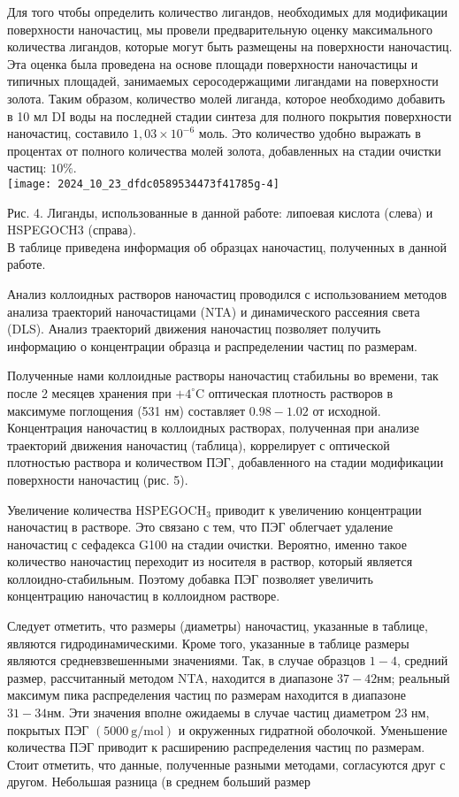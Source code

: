 \documentclass[10pt, a4paper]{article}
\begin{document}
Для того чтобы определить количество лигандов, необходимых для модификации поверхности наночастиц, мы провели предварительную оценку максимального количества лигандов, которые могут быть размещены на поверхности наночастиц. Эта оценка была проведена на основе площади поверхности наночастицы и типичных площадей, занимаемых серосодержащими лигандами на поверхности золота. Таким образом, количество молей лиганда, которое необходимо добавить в 10 мл DI воды на последней стадии синтеза для полного покрытия поверхности наночастиц, составило \(1,03 \times 10^{-6}\) моль. Это количество удобно выражать в процентах от полного количества молей золота, добавленных на стадии очистки частиц: \(10 \%\).\\
\texttt{[image: 2024\_10\_23\_dfdc0589534473f41785g-4]}

Рис. 4. Лиганды, использованные в данной работе: липоевая кислота (слева) и HSPEGOCH3 (справа).\\
В таблице приведена информация об образцах наночастиц, полученных в данной работе.

Анализ коллоидных растворов наночастиц проводился с использованием методов анализа траекторий наночастицами (NTA) и динамического рассеяния света (DLS). Анализ траекторий движения наночастиц позволяет получить информацию о концентрации образца и распределении частиц по размерам.

Полученные нами коллоидные растворы наночастиц стабильны во времени, так после 2 месяцев хранения при \(+4^{\circ} \mathrm{C}\) оптическая плотность растворов в максимуме поглощения (531 нм) составляет \(0.98-1.02\) от исходной. Концентрация наночастиц в коллоидных растворах, полученная при анализе траекторий движения наночастиц (таблица), коррелирует с оптической плотностью раствора и количеством ПЭГ, добавленного на стадии модификации поверхности наночастиц (рис. 5).

Увеличение количества \(\mathrm{HSPEGOCH}_{3}\) приводит к увеличению концентрации наночастиц в растворе. Это связано с тем, что ПЭГ облегчает удаление наночастиц с сефадекса G100 на стадии очистки. Вероятно, именно такое количество наночастиц переходит из носителя в раствор, который является коллоидно-стабильным. Поэтому добавка ПЭГ позволяет увеличить концентрацию наночастиц в коллоидном растворе.

Следует отметить, что размеры (диаметры) наночастиц, указанные в таблице, являются гидродинамическими. Кроме того, указанные в таблице размеры являются средневзвешенными значениями. Так, в случае образцов \(1-4\), средний размер, рассчитанный методом NTA, находится в диапазоне \(37-42 \text{нм}\); реальный максимум пика распределения частиц по размерам находится в диапазоне \(31-34 \text{нм}\). Эти значения вполне ожидаемы в случае частиц диаметром 23 нм, покрытых ПЭГ \((5000 \mathrm{~g} / \mathrm{mol})\) и окруженных гидратной оболочкой. Уменьшение количества ПЭГ приводит к расширению распределения частиц по размерам. Стоит отметить, что данные, полученные разными методами, согласуются друг с другом. 
Небольшая разница (в среднем больший размер
\end{document}
